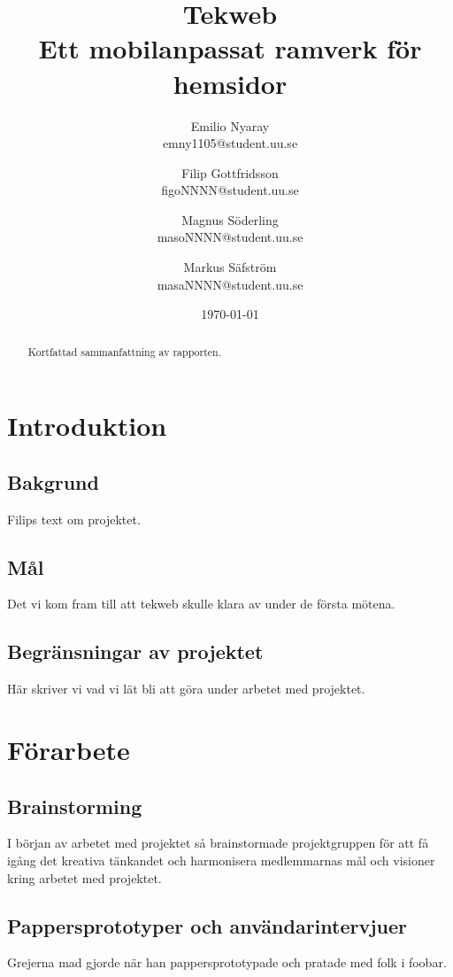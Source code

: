 \documentclass[11pt,a4paper]{report}
\title{Tekweb \\ \large{Ett mobilanpassat ramverk för hemsidor}}
\author{Emilio Nyaray \\ emny1105@student.uu.se      \and
        Filip Gottfridsson \\ figoNNNN@student.uu.se \and
        Magnus Söderling \\ masoNNNN@student.uu.se      \and
        Markus Säfström \\ masaNNNN@student.uu.se
}
\date{\today}
\begin{document}
\maketitle

\begin{abstract}
Kortfattad sammanfattning av rapporten.
\end{abstract}

\tableofcontents
\newpage

\chapter{Introduktion}
\section{Bakgrund}
Filips text om projektet.

\section{Mål}
Det vi kom fram till att tekweb skulle klara av under de första mötena.

\section{Begränsningar av projektet}
Här skriver vi vad vi lät bli att göra under arbetet med projektet.

\chapter{Förarbete}
\section{Brainstorming}
I början av arbetet med projektet så brainstormade projektgruppen för
att få igång det kreativa tänkandet och harmonisera medlemmarnas mål och
visioner kring arbetet med projektet.



\section{Pappersprototyper och användarintervjuer}
Grejerna mad gjorde när han pappersprototypade och pratade med folk i
foobar.
\end{document}

